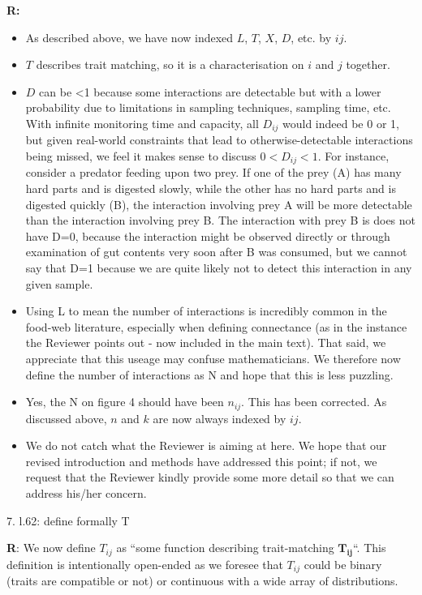 \documentclass[12pt]{letter}
\begin{document}
		\textbf{R:} 
			\begin{itemize}
				\item As described above, we have now indexed $L$, $T$, $X$, $D$, etc. by $ij$. 
				\item $T$ describes trait matching, so it is a characterisation on $i$ and $j$ together. 
				\item $D$ can be \textless1 because some interactions are detectable but with a lower probability due to limitations in sampling techniques, sampling time, etc. With infinite monitoring time and capacity, all $D_{ij}$ would indeed be 0 or 1, but given real-world constraints that lead to otherwise-detectable interactions being missed, we feel it makes sense to discuss $0<D_{ij}<1$. For instance, consider a predator feeding upon two prey. If one of the prey (A) has many hard parts and is digested slowly, while the other has no hard parts and is digested quickly (B), the interaction involving prey A will be more detectable than the interaction involving prey B. The interaction with prey B is does not have D=0, because the interaction might be observed directly or through examination of gut contents very soon after B was consumed, but we cannot say that D=1 because we are quite likely not to detect this interaction in any given sample. 
				\item Using L to mean the number of interactions is incredibly common in the food-web literature, especially when defining connectance (as in the instance the Reviewer points out - now included in the main text). That said, we appreciate that this useage may confuse mathematicians. We therefore now define the number of interactions as N and hope that this is less puzzling.
				\item Yes, the N on figure 4 should have been $n_{ij}$. This has been corrected. As discussed above, $n$ and $k$ are now always indexed by $ij$. 
				\item We do not catch what the Reviewer is aiming at here. We hope that our revised introduction and methods have addressed this point; if not, we request that the Reviewer kindly provide some more detail so that we can address his/her concern.
			\end{itemize}


	7. l.62: define formally T


		\textbf{R}: We now define $T_{ij}$ as ``some function describing trait-matching $\mathbf{T_{ij}}$``. This definition is intentionally open-ended as we foresee that $T_{ij}$ could be binary (traits are compatible or not) or continuous with a wide array of distributions.
\end{document}
